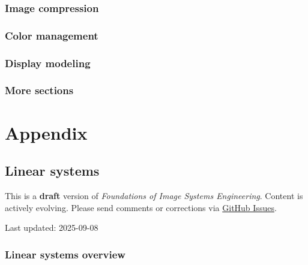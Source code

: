 \documentclass[
  letterpaper,
]{book}
\begin{document}
\section{Image compression}\label{image-compression}

\section{Color management}\label{color-management}

\section{Display modeling}\label{display-modeling}

\section{More sections}\label{more-sections}

\part{Appendix}

\chapter{Linear systems}\label{sec-appendix-linear-systems}

\begin{tcolorbox}[enhanced jigsaw, colframe=quarto-callout-warning-color-frame, titlerule=0mm, rightrule=.15mm, opacitybacktitle=0.6, colback=white, leftrule=.75mm, coltitle=black, title=\textcolor{quarto-callout-warning-color}{\faExclamationTriangle}\hspace{0.5em}{Work in Progress}, bottomrule=.15mm, colbacktitle=quarto-callout-warning-color!10!white, breakable, left=2mm, bottomtitle=1mm, toptitle=1mm, opacityback=0, arc=.35mm, toprule=.15mm]

This is a \textbf{draft} version of \emph{Foundations of Image Systems
Engineering}. Content is actively evolving. Please send comments or
corrections via \href{https://github.com/wandell/FISE-git/issues}{GitHub
Issues}.

Last updated: 2025-09-08

\end{tcolorbox}

\section{Linear systems
overview}\label{sec-appendix-linear-systems-overview}
\end{document}
